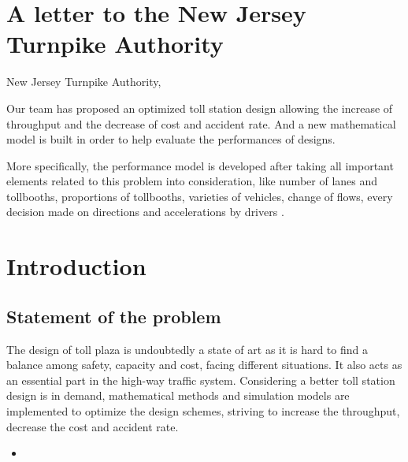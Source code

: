 \documentclass{mcmthesis}
\begin{document}
\section{A letter to the New Jersey Turnpike Authority}


New Jersey Turnpike Authority,

Our team has proposed an optimized toll station design allowing the increase of throughput and the decrease of cost and accident rate. And a new mathematical model is built in order to help evaluate the performances of designs. 

More specifically, the performance model is developed after taking all important elements related to this problem into consideration, like number of lanes and tollbooths, proportions of tollbooths, varieties of vehicles, change of flows, every decision made on directions and accelerations by drivers . 



\section{Introduction}

\subsection{Statement of the problem}

The design of toll plaza is undoubtedly a state of art as it is hard to find a balance among safety, capacity and cost, facing different situations. It also acts as an essential part in the high-way traffic system. Considering a better toll station design is in demand, mathematical methods and simulation models are implemented to optimize the design schemes, striving to increase the throughput, decrease the cost and accident rate.



\begin{itemize}

\item 
\end{itemize}







\begin{Theorem} \label{thm:latex}

\end{Theorem}

\begin{Lemma} \label{thm:tex}

\end{Lemma}
\end{document}
